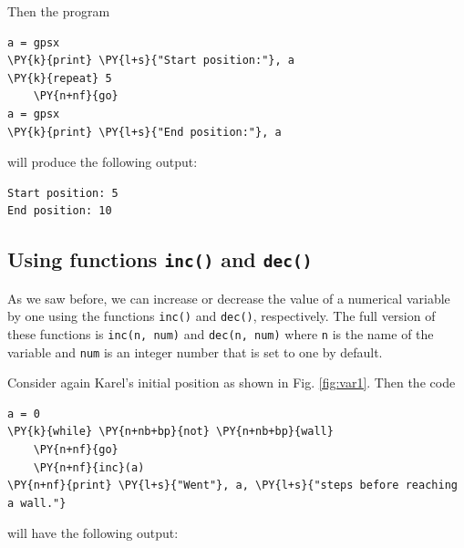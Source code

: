 \noindent
Then the program\\

\begin{bbox}
\begin{Verbatim}[commandchars=\\\{\}]
a = gpsx
\PY{k}{print} \PY{l+s}{"Start position:"}, a
\PY{k}{repeat} 5
    \PY{n+nf}{go}
a = gpsx 
\PY{k}{print} \PY{l+s}{"End position:"}, a
\end{Verbatim}
\end{bbox}
\vspace{6mm}

\noindent
will produce the following output:\\

\begin{ybox}
\begin{verbatim}
Start position: 5
End position: 10
\end{verbatim}
\end{ybox}
\vspace{6mm}

\subsection[\ \ Using functions {\tt inc()} and {\tt dec()}]{Using functions {\tt inc()} and {\tt dec()}}\label{subsec:incdec}

As we saw before, we can increase or decrease the value of a numerical 
variable by one using the functions {\tt inc()} and 
{\tt dec()}, respectively. The full version of these functions 
is {\tt inc(n, num)} and {\tt dec(n, num)} where {\tt n} is the 
name of the variable and {\tt num} is 
an integer number that is set to one by default.

Consider again Karel's initial position as shown 
in Fig. \ref{fig:var1}. Then the code\\

\begin{bbox}
\begin{Verbatim}[commandchars=\\\{\}]
a = 0
\PY{k}{while} \PY{n+nb+bp}{not} \PY{n+nb+bp}{wall}
    \PY{n+nf}{go}
    \PY{n+nf}{inc}(a)
\PY{n+nf}{print} \PY{l+s}{"Went"}, a, \PY{l+s}{"steps before reaching a wall."}
\end{Verbatim}
\end{bbox}
\vspace{6mm}

\noindent
will have the following output:\\

